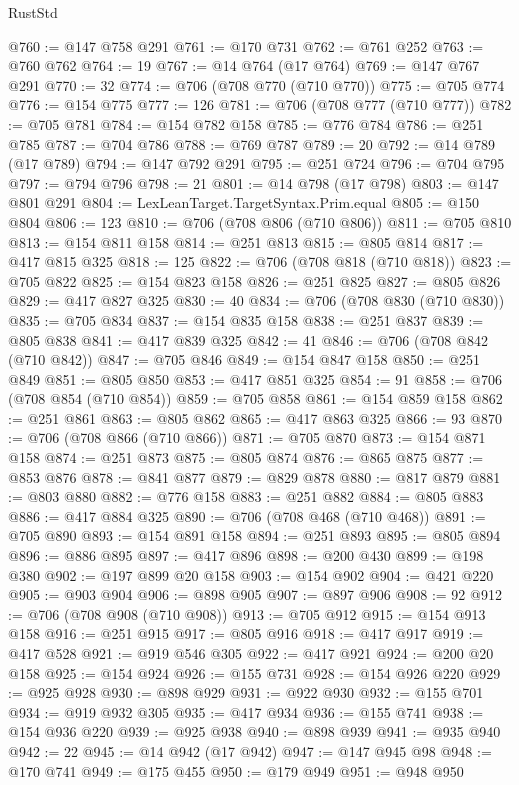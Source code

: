 \begin{lexlean}{RustStd}
\begin{coremodule}
@760 := @147 @758 @291
@761 := @170 @731
@762 := @761 @252
@763 := @760 @762
@764 := 19
@767 := @14 @764 (@17 @764)
@769 := @147 @767 @291
@770 := 32
@774 := @706 (@708 @770 (@710 @770))
@775 := @705 @774
@776 := @154 @775
@777 := 126
@781 := @706 (@708 @777 (@710 @777))
@782 := @705 @781
@784 := @154 @782 @158
@785 := @776 @784
@786 := @251 @785
@787 := @704 @786
@788 := @769 @787
@789 := 20
@792 := @14 @789 (@17 @789)
@794 := @147 @792 @291
@795 := @251 @724
@796 := @704 @795
@797 := @794 @796
@798 := 21
@801 := @14 @798 (@17 @798)
@803 := @147 @801 @291
@804 := LexLeanTarget.TargetSyntax.Prim.equal
@805 := @150 @804
@806 := 123
@810 := @706 (@708 @806 (@710 @806))
@811 := @705 @810
@813 := @154 @811 @158
@814 := @251 @813
@815 := @805 @814
@817 := @417 @815 @325
@818 := 125
@822 := @706 (@708 @818 (@710 @818))
@823 := @705 @822
@825 := @154 @823 @158
@826 := @251 @825
@827 := @805 @826
@829 := @417 @827 @325
@830 := 40
@834 := @706 (@708 @830 (@710 @830))
@835 := @705 @834
@837 := @154 @835 @158
@838 := @251 @837
@839 := @805 @838
@841 := @417 @839 @325
@842 := 41
@846 := @706 (@708 @842 (@710 @842))
@847 := @705 @846
@849 := @154 @847 @158
@850 := @251 @849
@851 := @805 @850
@853 := @417 @851 @325
@854 := 91
@858 := @706 (@708 @854 (@710 @854))
@859 := @705 @858
@861 := @154 @859 @158
@862 := @251 @861
@863 := @805 @862
@865 := @417 @863 @325
@866 := 93
@870 := @706 (@708 @866 (@710 @866))
@871 := @705 @870
@873 := @154 @871 @158
@874 := @251 @873
@875 := @805 @874
@876 := @865 @875
@877 := @853 @876
@878 := @841 @877
@879 := @829 @878
@880 := @817 @879
@881 := @803 @880
@882 := @776 @158
@883 := @251 @882
@884 := @805 @883
@886 := @417 @884 @325
@890 := @706 (@708 @468 (@710 @468))
@891 := @705 @890
@893 := @154 @891 @158
@894 := @251 @893
@895 := @805 @894
@896 := @886 @895
@897 := @417 @896
@898 := @200 @430
@899 := @198 @380
@902 := @197 @899 @20 @158
@903 := @154 @902
@904 := @421 @220
@905 := @903 @904
@906 := @898 @905
@907 := @897 @906
@908 := 92
@912 := @706 (@708 @908 (@710 @908))
@913 := @705 @912
@915 := @154 @913 @158
@916 := @251 @915
@917 := @805 @916
@918 := @417 @917
@919 := @417 @528
@921 := @919 @546 @305
@922 := @417 @921
@924 := @200 @20 @158
@925 := @154 @924
@926 := @155 @731
@928 := @154 @926 @220
@929 := @925 @928
@930 := @898 @929
@931 := @922 @930
@932 := @155 @701
@934 := @919 @932 @305
@935 := @417 @934
@936 := @155 @741
@938 := @154 @936 @220
@939 := @925 @938
@940 := @898 @939
@941 := @935 @940
@942 := 22
@945 := @14 @942 (@17 @942)
@947 := @147 @945 @98
@948 := @170 @741
@949 := @175 @455
@950 := @179 @949
@951 := @948 @950

\end{coremodule}
\end{lexlean}
